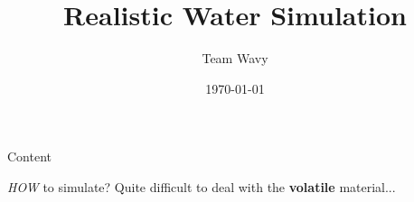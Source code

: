 \documentclass[handout,t]{beamer}
\title{Realistic Water Simulation}
\author{Team Wavy}
\institute{School of Data and Computer Science(SYSU)}
\date{\today}
\begin{document}

\frame{\titlepage}
\section[]{}
\begin{frame}{Content}
  \tableofcontents
\end{frame}
\begin{frame}[t]{\emph{HOW} to simulate?}
  \textcolor[rgb]{0.5,0.5,0.5}{Quite difficult to deal with the \textbf{\color{blue}volatile} material...}
  \begin{columns} %
    \begin{column}{.48\textwidth}
      \begin{figure}[thpb]
        \centering
\end{figure}
\end{column}
\end{columns}
\end{frame}
\end{document}
